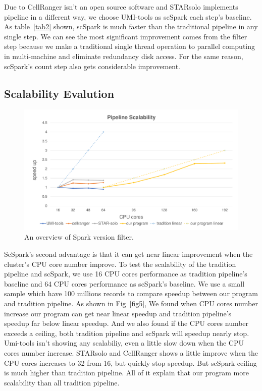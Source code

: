 \documentclass[runningheads]{llncs}
\begin{document}
Due to CellRanger isn't an open source software and STARsolo implements pipeline in a different way, we choose UMI-tools as scSpark each step's baseline.
As table~\ref{tab2} shown, scSpark is much faster than the traditional pipeline in any single step.
We can see the most significant improvement comes from the filter step because we make a traditional single thread operation to parallel computing in multi-machine and eliminate redundancy disk access.
For the same reason, scSpark's count step also gets considerable improvement.

\subsection{Scalability Evalution}
\begin{figure}
  \includegraphics[width=\textwidth]{fig4.pdf}
  \caption{An overview of Spark version filter.} \label{fig4}
\end{figure}
ScSpark's second advantage is that it can get near linear improvement when the cluster's CPU core number improve.
To test the scalability of the tradition pipeline and scSpark, we use 16 CPU cores performance as tradition pipeline's baseline and 64 CPU cores performance as scSpark's baseline.
We use a small sample which have 100 millions records to compare speedup between our program and tradition pipeline.
As shown in Fig~\ref{fig5}, We found when CPU cores number increase our program can get near linear speedup and tradition pipeline's speedup far below linear speedup.
And we also found if the CPU cores number exceeds a ceiling, both tradition pipeline and scSpark will speedup nearly stop.
Umi-tools isn't showing any scalabiliy, even a little slow down when the CPU cores number increase.
STARsolo and CellRanger shows a little improve when the CPU cores increases to 32 from 16, but quickly stop speedup.
But scSpark ceiling is much higher than tradition pipeline.
All of it explain that our program more scalability than all tradition pipeline.
\end{document}
